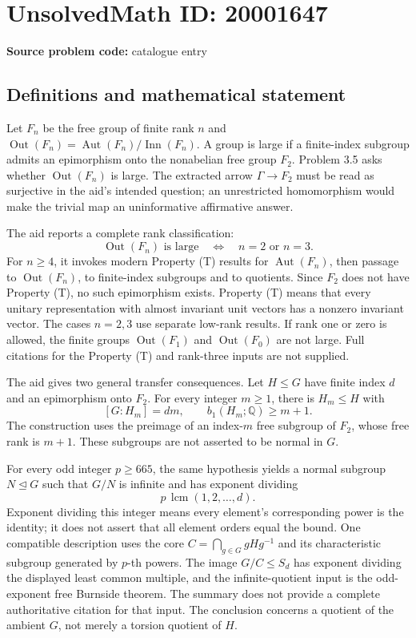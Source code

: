 \documentclass[11pt]{article}
\newcommand{\Q}{\mathbb{Q}}
\begin{document}
\section*{UnsolvedMath ID: 20001647}
\textbf{Source problem code:} catalogue entry
\subsection{Definitions and mathematical statement}
Let \(F_n\) be the free group of finite rank \(n\) and \(\operatorname{Out}(F_n)=\operatorname{Aut}(F_n)/\operatorname{Inn}(F_n)\). A group is large if a finite-index subgroup admits an epimorphism onto the nonabelian free group \(F_2\). Problem 3.5 asks whether \(\operatorname{Out}(F_n)\) is large. The extracted arrow \(\Gamma\to F_2\) must be read as surjective in the aid's intended question; an unrestricted homomorphism would make the trivial map an uninformative affirmative answer.

The aid reports a complete rank classification:
\[
\operatorname{Out}(F_n)\text{ is large}\quad\Longleftrightarrow\quad n=2\text{ or }n=3.
\]
For \(n\ge4\), it invokes modern Property (T) results for \(\operatorname{Aut}(F_n)\), then passage to \(\operatorname{Out}(F_n)\), to finite-index subgroups and to quotients. Since \(F_2\) does not have Property (T), no such epimorphism exists. Property (T) means that every unitary representation with almost invariant unit vectors has a nonzero invariant vector. The cases \(n=2,3\) use separate low-rank results. If rank one or zero is allowed, the finite groups \(\operatorname{Out}(F_1)\) and \(\operatorname{Out}(F_0)\) are not large. Full citations for the Property (T) and rank-three inputs are not supplied.

The aid gives two general transfer consequences. Let \(H\le G\) have finite index \(d\) and an epimorphism onto \(F_2\). For every integer \(m\ge1\), there is \(H_m\le H\) with
\[
[G:H_m]=dm,\qquad b_1(H_m;\Q)\ge m+1.
\]
The construction uses the preimage of an index-\(m\) free subgroup of \(F_2\), whose free rank is \(m+1\). These subgroups are not asserted to be normal in \(G\).

For every odd integer \(p\ge665\), the same hypothesis yields a normal subgroup \(N\trianglelefteq G\) such that \(G/N\) is infinite and has exponent dividing
\[
p\,\operatorname{lcm}(1,2,\ldots,d).
\]
Exponent dividing this integer means every element's corresponding power is the identity; it does not assert that all element orders equal the bound. One compatible description uses the core \(C=\bigcap_{g\in G}gHg^{-1}\) and its characteristic subgroup generated by \(p\)-th powers. The image \(G/C\le S_d\) has exponent dividing the displayed least common multiple, and the infinite-quotient input is the odd-exponent free Burnside theorem. The summary does not provide a complete authoritative citation for that input. The conclusion concerns a quotient of the ambient \(G\), not merely a torsion quotient of \(H\).
\end{document}

